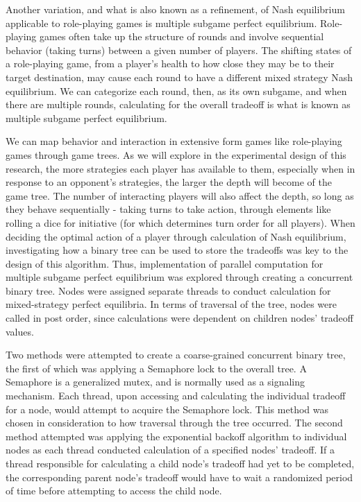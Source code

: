 \documentclass[conference]{IEEEtran}
\begin{document}
Another variation, and what is also known as a refinement, of Nash equilibrium applicable to role-playing games is multiple subgame perfect equilibrium. Role-playing games often take up the structure of rounds and involve sequential behavior (taking turns) between a given number of players. The shifting states of a role-playing game, from a player's health to how close they may be to their target destination, may cause each round to have a different mixed strategy Nash equilibrium. We can categorize each round, then, as its own subgame, and when there are multiple rounds, calculating for the overall tradeoff is what is known as multiple subgame perfect equilibrium. 

We can map behavior and interaction in extensive form games like role-playing games through game trees. As we will explore in the experimental design of this research, the more strategies each player has available to them, especially when in response to an opponent's strategies, the larger the depth will become of the game tree. The number of interacting players will also affect the depth, so long as they behave sequentially - taking turns to take action, through elements like rolling a dice for initiative (for which determines turn order for all players). When deciding the optimal action of a player through calculation of Nash equilibrium, investigating how a binary tree can be used to store the tradeoffs was key to the design of this algorithm. Thus, implementation of parallel computation for multiple subgame perfect equilibrium was explored through creating a concurrent binary tree. Nodes were assigned separate threads to conduct calculation for mixed-strategy perfect equilibria. In terms of traversal of the tree, nodes were called in post order, since calculations were dependent on children nodes' tradeoff values. 

Two methods were attempted to create a coarse-grained  concurrent binary tree, the first of which was applying a Semaphore lock to the overall tree. A Semaphore is a generalized mutex, and is normally used as a signaling mechanism. Each thread, upon accessing and calculating the individual tradeoff for a node, would attempt to acquire the Semaphore lock. This method was chosen in consideration to how traversal through the tree occurred. The second method attempted was applying the exponential backoff algorithm to individual nodes as each thread conducted calculation of a specified nodes' tradeoff.  If a thread responsible for calculating a child node's tradeoff had yet to be completed, the corresponding parent node's tradeoff would have to wait a randomized period of time before attempting to access the child node. 
\medskip
\end{document}
